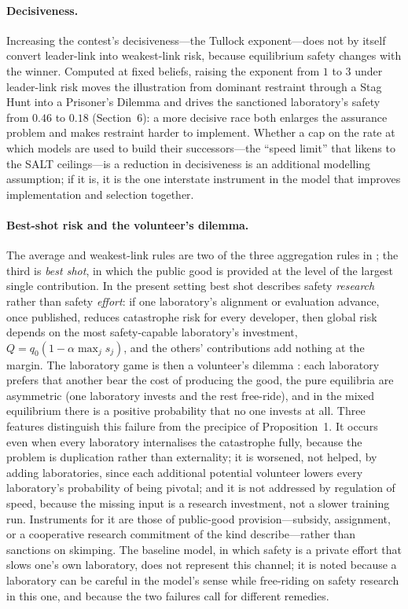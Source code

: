 \documentclass[11pt]{article}
\theoremstyle{plain}
\theoremstyle{definition}
\theoremstyle{remark}
\begin{document}
\paragraph{Decisiveness.} Increasing the contest's decisiveness---the Tullock exponent---does not by itself convert leader-link into weakest-link risk, because equilibrium safety changes with the winner. Computed at fixed beliefs, raising the exponent from $1$ to $3$ under leader-link risk moves the illustration from dominant restraint through a Stag Hunt into a Prisoner's Dilemma and drives the sanctioned laboratory's safety from $0.46$ to $0.18$ (Section~6): a more decisive race both enlarges the assurance problem and makes restraint harder to implement. Whether a cap on the rate at which models are used to build their successors---the ``speed limit'' that \citet{amodei2026} likens to the SALT ceilings---is a reduction in decisiveness is an additional modelling assumption; if it is, it is the one interstate instrument in the model that improves implementation and selection together.

\paragraph{Best-shot risk and the volunteer's dilemma.} The average and weakest-link rules are two of the three aggregation rules in \citet{hirshleifer1983}; the third is \emph{best shot}, in which the public good is provided at the level of the largest single contribution. In the present setting best shot describes safety \emph{research} rather than safety \emph{effort}: if one laboratory's alignment or evaluation advance, once published, reduces catastrophe risk for every developer, then global risk depends on the most safety-capable laboratory's investment, $Q=q_0(1-\alpha\max_j s_j)$, and the others' contributions add nothing at the margin. The laboratory game is then a volunteer's dilemma \citep{diekmann1985}: each laboratory prefers that another bear the cost of producing the good, the pure equilibria are asymmetric (one laboratory invests and the rest free-ride), and in the mixed equilibrium there is a positive probability that no one invests at all. Three features distinguish this failure from the precipice of Proposition~1. It occurs even when every laboratory internalises the catastrophe fully, because the problem is duplication rather than externality; it is worsened, not helped, by adding laboratories, since each additional potential volunteer lowers every laboratory's probability of being pivotal; and it is not addressed by regulation of speed, because the missing input is a research investment, not a slower training run. Instruments for it are those of public-good provision---subsidy, assignment, or a cooperative research commitment of the kind \citet{askell2019} describe---rather than sanctions on skimping. The baseline model, in which safety is a private effort that slows one's own laboratory, does not represent this channel; it is noted because a laboratory can be careful in the model's sense while free-riding on safety research in this one, and because the two failures call for different remedies.
\end{document}
